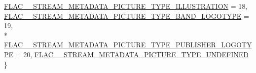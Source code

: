 \begin{DoxyCompactItemize}
\hyperlink{group__flac__format_ggaf6d3e836cee023e0b8d897f1fdc9825da89ba412c9d89c937c28afdab508d047a}{F\+L\+A\+C\+\_\+\+\_\+\+S\+T\+R\+E\+A\+M\+\_\+\+M\+E\+T\+A\+D\+A\+T\+A\+\_\+\+P\+I\+C\+T\+U\+R\+E\+\_\+\+T\+Y\+P\+E\+\_\+\+I\+L\+L\+U\+S\+T\+R\+A\+T\+I\+ON} = 18, 
\hyperlink{group__flac__format_ggaf6d3e836cee023e0b8d897f1fdc9825da751716a4528a78a8d53f435c816c4917}{F\+L\+A\+C\+\_\+\+\_\+\+S\+T\+R\+E\+A\+M\+\_\+\+M\+E\+T\+A\+D\+A\+T\+A\+\_\+\+P\+I\+C\+T\+U\+R\+E\+\_\+\+T\+Y\+P\+E\+\_\+\+B\+A\+N\+D\+\_\+\+L\+O\+G\+O\+T\+Y\+PE} = 19, 
\\*
\hyperlink{group__flac__format_ggaf6d3e836cee023e0b8d897f1fdc9825da31d75150a4079482fe122e703eff9141}{F\+L\+A\+C\+\_\+\+\_\+\+S\+T\+R\+E\+A\+M\+\_\+\+M\+E\+T\+A\+D\+A\+T\+A\+\_\+\+P\+I\+C\+T\+U\+R\+E\+\_\+\+T\+Y\+P\+E\+\_\+\+P\+U\+B\+L\+I\+S\+H\+E\+R\+\_\+\+L\+O\+G\+O\+T\+Y\+PE} = 20, 
\hyperlink{group__flac__format_ggaf6d3e836cee023e0b8d897f1fdc9825dae294ac8c7865c196fc52440fbbca9ad1}{F\+L\+A\+C\+\_\+\+\_\+\+S\+T\+R\+E\+A\+M\+\_\+\+M\+E\+T\+A\+D\+A\+T\+A\+\_\+\+P\+I\+C\+T\+U\+R\+E\+\_\+\+T\+Y\+P\+E\+\_\+\+U\+N\+D\+E\+F\+I\+N\+ED}
 \}
\end{DoxyCompactItemize}
